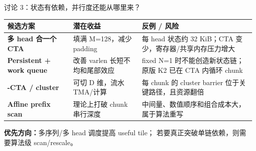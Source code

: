 \documentclass[aspectratio=169,10pt]{beamer}
\newcommand{\key}[1]{\textcolor{KdaBlue}{\textbf{#1}}}
\begin{document}
\begin{frame}{讨论 3：状态有依赖，并行度还能从哪里来？}
  \small
  \begin{tabular}{>{\bfseries}p{}p{}p{}}
    \toprule
    候选方案 & 潜在收益 & 反例 / 风险 \\
    \midrule
    多 head 合一个 CTA
      & 填满 M=128，减少 padding
      & 每 head 状态约 32 KiB；CTA 变少，寄存器/共享内存压力增大 \\
    \addlinespace
    Persistent + work queue
      & 改善 varlen 长短不均和尾部效应
      & fixed N=1 时不能创造新状态链；原版 K2 已在 CTA 内循环 chunk \\
    \addlinespace
    2-CTA / cluster
      & 可切 D 维，流水 TMA/计算
      & 每 chunk 的 cluster barrier 位于关键路径，且资源翻倍 \\
    \addlinespace
    Affine prefix scan
      & 理论上打破 chunk 串行深度
      & 中间量、数值顺序和组合成本大，属于算法重写 \\
    \bottomrule
  \end{tabular}

  \vspace{0.6em}
  \centering
  \key{优先方向：}多序列/多 head 调度提高 useful tile；
  若要真正突破单链依赖，则需要算法级 scan/rescale。

\end{frame}
\end{document}
